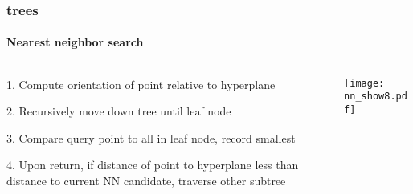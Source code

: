 \begin{frame}[noframenumbering]
  \frametitle{\kd trees}
  \framesubtitle{Nearest neighbor search}
  \begin{columns}[T]
    \begin{column}{.5\textwidth}
      \begin{block}{}%
        {\color{white} 1.\hspace{1mm} Compute orientation of point relative to hyperplane
          \\\vspace{0.4cm}
        
        2.\hspace{1mm} Recursively move down tree until leaf node\\\vspace{0.4cm}

        {\color{graph-red}
        3.\hspace{1mm} Compare query point to all in leaf node, record smallest}\\\vspace{0.4cm}
    
        4.\hspace{1mm} Upon return, if distance of point to hyperplane less than distance to current
          NN candidate, traverse other subtree}
      \end{block}
    \end{column}
    \begin{column}{.5\textwidth}
      \begin{block}{}
        \texttt{[image: nn\_show8.pdf]}
      \end{block}
    \end{column}
  \end{columns}
\end{frame}
